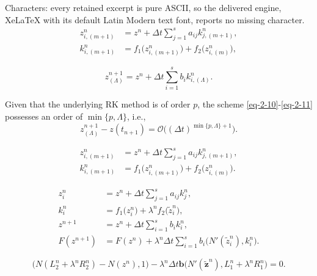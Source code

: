 \documentclass[10pt,a4paper]{amsart}
\begin{document}
Characters: every retained excerpt is pure ASCII, so the delivered engine, XeLaTeX with its default Latin Modern text font, reports no missing character.
	\begin{equation}\label{eq-2-10}
	\begin{aligned}
		z_{i,(m+1)}^n&=z^n+\Delta t\sum_{j=1}^sa_{ij}k_{j,(m+1)}^n,\\ k_{i,(m+1)}^n&=f_1\big(z_{i,(m+1)}^n\big)+f_2\big(z_{i,(m)}^n\big),
		\end{aligned}
	\end{equation}

	\begin{equation}\label{eq-2-11}
		z_{(\Lambda)}^{n+1}=z^n+\Delta t\sum_{i=1}^sb_ik_{i,(\Lambda)}^n.
	\end{equation}

\begin{theorem}\label{Th-2-4}
Given that the underlying RK method is of order $p$, the scheme \eqref{eq-2-10}-\eqref{eq-2-11} possesses an order of $\min\{p,\Lambda\}$, i.e.,
\begin{equation}\label{eq-2-16}
	z_{(\Lambda)}^{n+1}-z(t_{n+1})=\mathcal{O}\big((\Delta t)^{\min\{p,\Lambda\}+1}\big).
\end{equation}
\end{theorem}

	\begin{equation}\label{eq-2-17}
		\begin{aligned}
			z_{i,(m+1)}^n&=z^n+\Delta t\sum_{j=1}^sa_{ij}k_{j,(m+1)}^n,\\ k_{i,(m+1)}^n&=f_1\big(z_{i,(m+1)}^n\big)+f_2\big(z_{i,(m)}^n\big).
		\end{aligned}
	\end{equation}

	\begin{equation}\label{eq-2-18}
		\begin{aligned}
			z_i^n&=z^n+\Delta t\sum_{j=1}^sa_{ij}k_j^n,\\
			k_i^n&=f_1\big(z_i^n\big)+\lambda^nf_2\big(\tilde{z}_i^n\big),\\
			z^{n+1}&=z^n+\Delta t\sum_{i=1}^sb_ik_i^n,\\
			F(z^{n+1})&=F(z^n)+\lambda^n\Delta t\sum_{i=1}^sb_i\big(N'(\tilde{z}_i^n),k_i^n\big).
		\end{aligned}
	\end{equation}

\begin{equation}\label{eq-2-28}
	\big(N(L_2^n+\lambda^nR_2^n)-N(z^n),1\big)-\lambda^n\Delta t\textbf{b}\big(N'(\tilde{\textbf{z}}^n),L_1^n+\lambda^nR_1^n\big)=0.
\end{equation}
\end{document}
